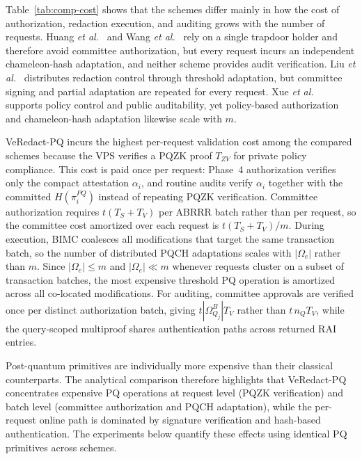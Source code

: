 \documentclass[lettersize,journal]{IEEEtran}
\begin{document}
Table~\ref{tab:comp-cost} shows that the schemes differ mainly in how
the cost of authorization, redaction execution, and auditing grows with
the number of requests. Huang \emph{et al.}~\cite{ref14} and
Wang \emph{et al.}~\cite{ref17} rely on a single trapdoor holder and
therefore avoid committee authorization, but every request incurs an
independent chameleon-hash adaptation, and neither scheme provides
audit verification. Liu \emph{et al.}~\cite{ref27} distributes redaction
control through threshold adaptation, but committee signing and partial
adaptation are repeated for every request. Xue \emph{et al.}~\cite{ref33}
supports policy control and public auditability, yet policy-based
authorization and chameleon-hash adaptation likewise scale with $m$.

VeRedact-PQ incurs the highest per-request validation cost among the
compared schemes because the VPS verifies a PQZK proof $T_{ZV}$ for
private policy compliance. This cost is paid once per request: Phase~4
authorization verifies only the compact attestation $\alpha_i$, and
routine audits verify $\alpha_i$ together with the committed
$H(\pi_i^{PQ})$ instead of repeating PQZK verification. Committee
authorization requires $t(T_S+T_V)$ per ABRRR batch rather than per
request, so the committee cost amortized over each request is
$t(T_S+T_V)/m$. During execution, BIMC coalesces all modifications that
target the same transaction batch, so the number of distributed PQCH
adaptations scales with $|\Omega_e|$ rather than $m$. Since
$|\Omega_e|\le m$ and $|\Omega_e|\ll m$ whenever requests cluster on a
subset of transaction batches, the most expensive threshold PQ operation
is amortized across all co-located modifications. For auditing, committee
approvals are verified once per distinct authorization batch, giving
$t|\Omega_{Q_j}^B|T_V$ rather than $t\,n_QT_V$, while the query-scoped
multiproof shares authentication paths across returned RAI entries.

Post-quantum primitives are individually more expensive than their
classical counterparts. The analytical comparison therefore highlights
that VeRedact-PQ concentrates expensive PQ operations at request level
(PQZK verification) and batch level (committee authorization and PQCH
adaptation), while the per-request online path is dominated by
signature verification and hash-based authentication. The experiments
below quantify these effects using identical PQ primitives across
schemes.

\end{document}
